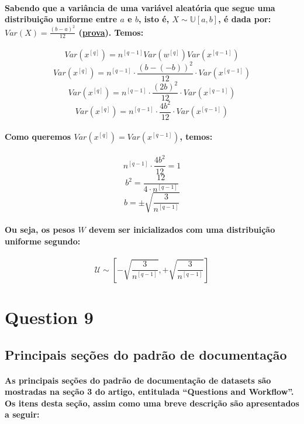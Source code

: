 \documentclass[a4paper]{article}    %
\begin{document}
\paragraph{Sabendo que a variância de uma variável aleatória que segue uma distribuição uniforme entre $a$ e $b$, isto é, $X \sim \mathbb{U}[a,b]$, é dada por: $Var(X) = \frac{(b-a)^2}{12}$ (\href{https://proofwiki.org/wiki/Variance_of_Continuous_Uniform_Distribution}{prova}). Temos:}
\[Var(x^{[q]}) = n^{[q-1]} Var(w^{[q]})Var(x^{[q-1]})\]
\[Var(x^{[q]}) = n^{[q-1]} \cdot \frac{(b-(-b))^2}{12} \cdot Var(x^{[q-1]})\]
\[Var(x^{[q]}) = n^{[q-1]} \cdot \frac{(2b)^2}{12} \cdot Var(x^{[q-1]})\]
\[Var(x^{[q]}) = n^{[q-1]} \cdot \frac{4b^2}{12} \cdot Var(x^{[q-1]})\]

\paragraph{Como queremos $Var(x^{[q]}) = Var(x^{[q-1]})$, temos:}
\[n^{[q-1]} \cdot \frac{4b^2}{12} = 1\]
\[b^2 = \frac{12}{4 \cdot n^{[q-1]}}\]
\[\boxed{b = \pm\sqrt{\frac{3}{n^{[q-1]}}}}\]

\paragraph{Ou seja, os pesos $W$ devem ser inicializados com uma distribuição uniforme segundo:}
\[\mathcal{U} \sim \left[-\sqrt{\frac{3}{n^{[q-1]}}}, +\sqrt{\frac{3}{n^{[q-1]}}}\right]\]

\newpage
\setcounter{section}{9}
\setcounter{subsection}{0}
\section*{Question 9}

\subsection{Principais seções do padrão de documentação}
\paragraph{As principais seções do padrão de documentação de datasets são mostradas na seção 3 do artigo, entitulada ``Questions and Workflow''. Os itens desta seção, assim como uma breve descrição são apresentados a seguir:}
\end{document}
